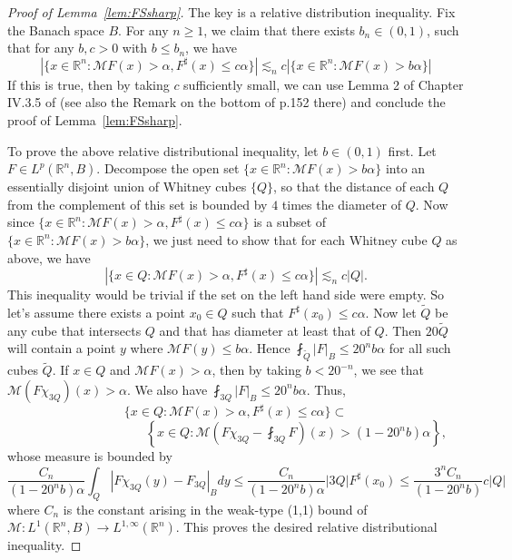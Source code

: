 \documentclass[12pt,leqno]{amsart}
\def\R{\mathbb{R}}
\theoremstyle{plain}
\numberwithin{equation}{section}
\begin{document}
\begin{proof}[Proof of Lemma~\ref{lem:FSsharp}]
The key is a relative distribution inequality. Fix the Banach space $B$. For any $n \geq 1$, we claim that there exists $b_n \in (0,1)$, such that for any $b, c > 0$ with $b \leq b_n$, we have
\[
|\{x \in \R^n \colon \mathcal{M} F(x) > \alpha, F^{\sharp}(x) \leq c \alpha\}| \lesssim_n c |\{x \in \R^n \colon \mathcal{M} F(x) > b \alpha\}|
\]
If this is true, then by taking $c$ sufficiently small, we can use Lemma 2 of Chapter IV.3.5 of \cite{MR1232192} (see also the Remark on the bottom of p.152 there) and conclude the proof of Lemma~\ref{lem:FSsharp}.

To prove the above relative distributional inequality, let $b \in (0,1)$ first. Let $F \in L^p(\R^n,B)$. Decompose the open set $\{x \in \R^n \colon \mathcal{M} F(x) > b \alpha\}$ into an essentially disjoint union of Whitney cubes $\{Q\}$, so that the distance of each $Q$ from the complement of this set is bounded by $4$ times the diameter of $Q$. Now since $\{x \in \R^n \colon \mathcal{M} F(x) > \alpha, F^{\sharp}(x) \leq c \alpha\}$ is a subset of $\{x \in \R^n \colon \mathcal{M} F(x) > b \alpha\}$, we just need to show that for each Whitney cube $Q$ as above, we have
\[
|\{x \in Q \colon \mathcal{M} F(x) > \alpha, F^{\sharp}(x) \leq c \alpha\}| \lesssim_n c |Q|.
\]
This inequality would be trivial if the set on the left hand side were empty. So let's assume there exists a point $x_0 \in Q$ such that $F^{\sharp}(x_0) \leq c\alpha$.  Now let $\tilde{Q}$ be any cube that intersects $Q$ and that has diameter at least that of $Q$. Then $20\tilde{Q}$ will contain a point $y$ where $\mathcal{M} F(y) \leq b \alpha$. Hence $\fint_{\tilde{Q}} |F|_B \leq 20^n b\alpha$ for all such cubes $\tilde{Q}$. If $x \in Q$ and $\mathcal{M} F(x) > \alpha$, then by taking $b < 20^{-n}$, we see that $\mathcal{M} (F \chi_{3Q})(x) > \alpha$. We also have $\fint_{3Q} |F|_B \leq 20^n b\alpha$. Thus,
\[
\{x \in Q \colon \mathcal{M} F(x) > \alpha, F^{\sharp}(x) \leq c \alpha \} \subset\]
\[\hspace{4cm} \left \{x \in Q \colon \mathcal{M} \left(F \chi_{3Q} - \fint_{3Q} F \right)(x) > (1-20^n b)\alpha \right \},
\]
whose measure is bounded by 
\[
\frac{C_n}{(1-20^n b) \alpha} \int_Q |F \chi_{3Q}(y) - F_{3Q}|_B dy 
\leq \frac{C_n}{(1-20^n b) \alpha} |3Q| F^{\sharp}(x_0) \leq \frac{3^n C_n}{(1-20^n b)} c|Q|
\]
where $C_n$ is the constant arising in the weak-type (1,1) bound of $\mathcal{M} \colon L^1(\R^n,B) \to L^{1,\infty}(\R^n)$.
This proves the desired relative distributional inequality.
\end{proof}
\end{document}
